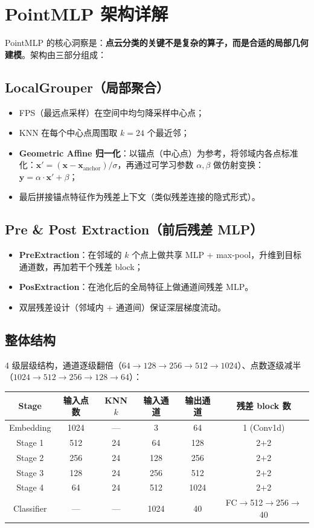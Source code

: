 \documentclass[10pt,a4paper]{ctexart}
\begin{document}
\section{PointMLP 架构详解}

PointMLP 的核心洞察是：\textbf{点云分类的关键不是复杂的算子，而是合适的局部几何建模}。架构由三部分组成：

\subsection{LocalGrouper（局部聚合）}
\begin{itemize}
\item FPS（最远点采样）在空间中均匀降采样中心点；
\item KNN 在每个中心点周围取 $k=24$ 个最近邻；
\item \textbf{Geometric Affine 归一化}：以锚点（中心点）为参考，将邻域内各点标准化：$\mathbf{x}' = (\mathbf{x} - \mathbf{x}_{\text{anchor}}) / \sigma$，再通过可学习参数 $\alpha,\beta$ 做仿射变换：$\mathbf{y} = \alpha \cdot \mathbf{x}' + \beta$；
\item 最后拼接锚点特征作为残差上下文（类似残差连接的隐式形式）。
\end{itemize}

\subsection{Pre \& Post Extraction（前后残差 MLP）}
\begin{itemize}
\item \textbf{PreExtraction}：在邻域的 $k$ 个点上做共享 MLP + max-pool，升维到目标通道数，再加若干个残差 block；
\item \textbf{PosExtraction}：在池化后的全局特征上做通道间残差 MLP。
\item 双层残差设计（邻域内 + 通道间）保证深层梯度流动。
\end{itemize}

\subsection{整体结构}
4 级层级结构，通道逐级翻倍（$64\to128\to256\to512\to1024$）、点数逐级减半（$1024\to512\to256\to128\to64$）：

\begin{center}\small
\begin{tabular}{cccccc}
\toprule
Stage & 输入点数 & KNN $k$ & 输入通道 & 输出通道 & 残差 block 数 \\
\midrule
Embedding & 1024 & ---  & 3    & 64  & 1 (Conv1d) \\
Stage 1  & 512  & 24 & 64   & 128 & 2+2 \\
Stage 2  & 256  & 24 & 128  & 256 & 2+2 \\
Stage 3  & 128  & 24 & 256  & 512 & 2+2 \\
Stage 4  & 64   & 24 & 512  & 1024& 2+2 \\
Classifier & --- & --- & 1024 & 40 & FC$\to$512$\to$256$\to$40 \\
\bottomrule
\end{tabular}
\end{center}
\end{document}
